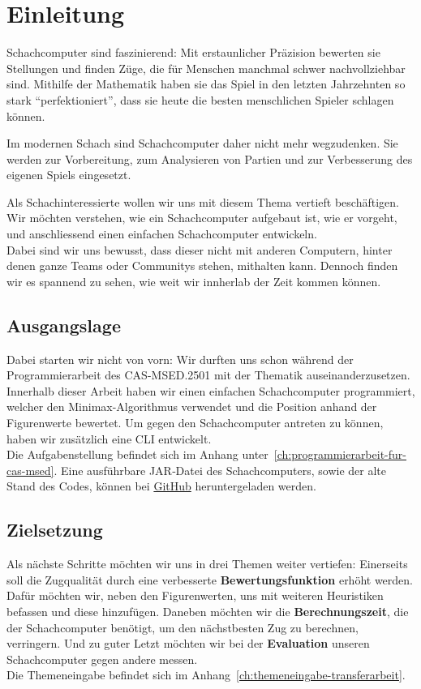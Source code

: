\chapter{Einleitung}

Schachcomputer sind faszinierend: Mit erstaunlicher Präzision bewerten sie Stellungen und finden Züge, die für Menschen
manchmal schwer nachvollziehbar sind. Mithilfe der Mathematik haben sie das Spiel in den letzten Jahrzehnten
so stark \enquote{perfektioniert}, dass sie heute die besten menschlichen Spieler schlagen können.

Im modernen Schach sind Schachcomputer daher nicht mehr wegzudenken. Sie werden zur Vorbereitung, zum Analysieren von
Partien und zur Verbesserung des eigenen Spiels eingesetzt.

Als Schachinteressierte wollen wir uns mit diesem Thema vertieft beschäftigen. Wir möchten verstehen,
wie ein Schachcomputer aufgebaut ist, wie er vorgeht, und anschliessend einen einfachen Schachcomputer entwickeln. \\
Dabei sind wir uns bewusst, dass dieser nicht mit anderen Computern, hinter denen ganze Teams oder Communitys stehen,
mithalten kann. Dennoch finden wir es spannend zu sehen, wie weit wir innherlab der Zeit kommen können.

\section{Ausgangslage}
Dabei starten wir nicht von vorn: Wir durften uns schon während der Programmierarbeit des CAS-MSED.2501 mit der Thematik
auseinanderzusetzen. Innerhalb dieser Arbeit haben wir einen einfachen Schachcomputer programmiert, welcher den
Minimax-Algorithmus verwendet und die Position anhand der Figurenwerte bewertet. Um gegen den Schachcomputer antreten zu
können, haben wir zusätzlich eine CLI entwickelt. \\
Die Aufgabenstellung befindet sich im Anhang unter~\ref{ch:programmierarbeit-fur-cas-msed}. Eine ausführbare JAR‑Datei
des Schachcomputers, sowie der alte Stand des Codes, können bei
\href{https://github.com/l2c0r3/blobfish/releases/tag/v1.0.0}{GitHub} heruntergeladen werden.

\section{Zielsetzung}
Als nächste Schritte möchten wir uns in drei Themen weiter vertiefen: Einerseits soll die Zugqualität durch eine
verbesserte \textbf{Bewertungsfunktion} erhöht werden. Dafür möchten wir, neben den Figurenwerten, uns mit weiteren
Heuristiken befassen und diese hinzufügen. Daneben möchten wir die \textbf{Berechnungszeit}, die der Schachcomputer
benötigt, um den nächstbesten Zug zu berechnen, verringern. Und zu guter Letzt möchten wir bei der \textbf{Evaluation}
unseren Schachcomputer gegen andere messen. \\
Die Themeneingabe befindet sich im Anhang~\ref{ch:themeneingabe-transferarbeit}.